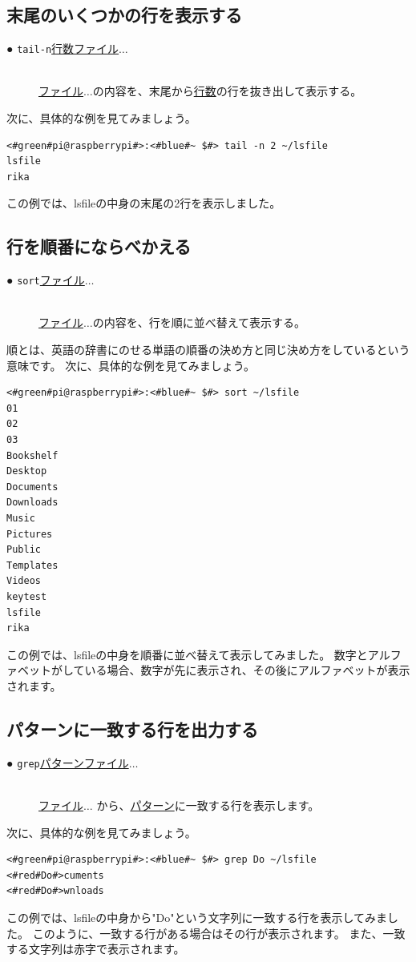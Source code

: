 \documentclass[text03.tex]{subfiles}
\begin{document}
\subsection{末尾のいくつかの行を表示する}
\begin{description}
    \item[● \texttt{tail}\textvisiblespace \texttt{-n}\textvisiblespace \underline{行数}\textvisiblespace \underline{ファイル}$\ldots$ ]\mbox{}\\
    \underline{ファイル}$\ldots$の内容を、末尾から\underline{行数}の行を抜き出して表示する。
\end{description}
次に、具体的な例を見てみましょう。
\begin{lstlisting}[caption=tailコマンドの実行例, label=shuf_example]
<#green#pi@raspberrypi#>:<#blue#~ $#> tail -n 2 ~/lsfile
lsfile
rika
\end{lstlisting}
この例では、lsfileの中身の末尾の2行を表示しました。

\subsection{行を順番にならべかえる}
\begin{description}
    \item[● \texttt{sort}\textvisiblespace \underline{ファイル}$\ldots$ ]\mbox{}\\
    \underline{ファイル}$\ldots$の内容を、行を順に並べ替えて表示する。
\end{description}
順とは、英語の辞書にのせる単語の順番の決め方と同じ決め方をしているという意味です。
次に、具体的な例を見てみましょう。
\begin{lstlisting}[caption=sortコマンドの実行例, label=sort_example]
<#green#pi@raspberrypi#>:<#blue#~ $#> sort ~/lsfile
01
02
03
Bookshelf
Desktop
Documents
Downloads
Music
Pictures
Public
Templates
Videos
keytest
lsfile
rika
\end{lstlisting}
この例では、lsfileの中身を順番に並べ替えて表示してみました。
数字とアルファベットがしている場合、数字が先に表示され、その後にアルファベットが表示されます。

\subsection{パターンに一致する行を出力する}
\begin{description}
    \item[● \texttt{grep}\textvisiblespace \underline{パターン}\textvisiblespace \underline{ファイル}$\ldots$ ]\mbox{}\\
    \underline{ファイル}$\ldots$ から、\underline{パターン}に一致する行を表示します。
\end{description}
次に、具体的な例を見てみましょう。
\begin{lstlisting}[caption=grepコマンドの実行例, label=grep_example]
<#green#pi@raspberrypi#>:<#blue#~ $#> grep Do ~/lsfile
<#red#Do#>cuments
<#red#Do#>wnloads
\end{lstlisting}
この例では、lsfileの中身から"Do"という文字列に一致する行を表示してみました。
このように、一致する行がある場合はその行が表示されます。
また、一致する文字列は赤字で表示されます。
\end{document}
